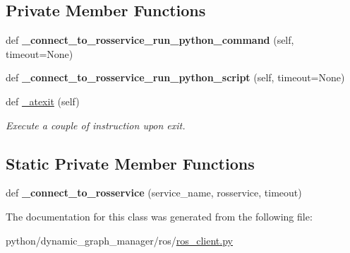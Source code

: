 \subsection*{Private Member Functions}
\begin{DoxyCompactItemize}
\item 
def {\bfseries \+\_\+connect\+\_\+to\+\_\+rosservice\+\_\+run\+\_\+python\+\_\+command} (self, timeout=None)\hypertarget{classros_1_1ros__client_1_1RosPythonInterpreter_a443b997ed6c8f6a0bea05aae15403686}{}\label{classros_1_1ros__client_1_1RosPythonInterpreter_a443b997ed6c8f6a0bea05aae15403686}

\item 
def {\bfseries \+\_\+connect\+\_\+to\+\_\+rosservice\+\_\+run\+\_\+python\+\_\+script} (self, timeout=None)\hypertarget{classros_1_1ros__client_1_1RosPythonInterpreter_a051256d44254766bd342d5f68f30b454}{}\label{classros_1_1ros__client_1_1RosPythonInterpreter_a051256d44254766bd342d5f68f30b454}

\item 
def \hyperlink{classros_1_1ros__client_1_1RosPythonInterpreter_a817a0c056aeeba19895cb8c111c370df}{\+\_\+atexit} (self)\hypertarget{classros_1_1ros__client_1_1RosPythonInterpreter_a817a0c056aeeba19895cb8c111c370df}{}\label{classros_1_1ros__client_1_1RosPythonInterpreter_a817a0c056aeeba19895cb8c111c370df}

\begin{DoxyCompactList}\small\item\em Execute a couple of instruction upon exit. \end{DoxyCompactList}\end{DoxyCompactItemize}
\subsection*{Static Private Member Functions}
\begin{DoxyCompactItemize}
\item 
def {\bfseries \+\_\+connect\+\_\+to\+\_\+rosservice} (service\+\_\+name, rosservice, timeout)\hypertarget{classros_1_1ros__client_1_1RosPythonInterpreter_a8a6ff47e74db5c036872d3628957c9d0}{}\label{classros_1_1ros__client_1_1RosPythonInterpreter_a8a6ff47e74db5c036872d3628957c9d0}

\end{DoxyCompactItemize}


The documentation for this class was generated from the following file\+:\begin{DoxyCompactItemize}
\item 
python/dynamic\+\_\+graph\+\_\+manager/ros/\hyperlink{ros__client_8py}{ros\+\_\+client.\+py}\end{DoxyCompactItemize}

